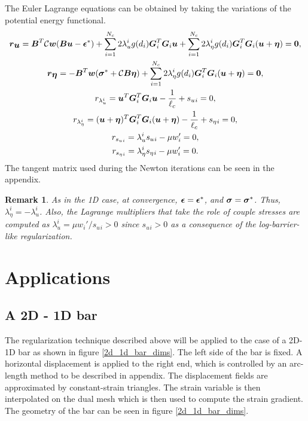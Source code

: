 \documentclass[11pt]{elsarticle}
\newtheorem*{remark}{Remark}
\begin{document}
The Euler Lagrange equations can be obtained by taking the variations of the potential energy functional.
\begin{gather}
	\mbox{\boldmath $r$}_{\mbox{\boldmath $u$}} = \mbox{\boldmath $B$}^T \mathcal{C} \mbox{\boldmath $w$}(\mbox{\boldmath $B$} \mbox{\boldmath $u$} - \mbox{\boldmath $\epsilon$}^*) + \sum_{i=1}^{N_c} 2 \lambda_u^ i  g(d_i) \mbox{\boldmath $G$}_i ^T \mbox{\boldmath $G$}_i \mbox{\boldmath $u$}
	+\sum_{i=1}^{N_c} 2 \lambda_\eta^ i  g(d_i) \mbox{\boldmath $G$}_i ^T \mbox{\boldmath $G$}_i (\mbox{\boldmath $u$}+\mbox{\boldmath $\eta$}) = \bf0, \\
	\mbox{\boldmath $r$}_{\mbox{\boldmath $\eta$}} = -\mbox{\boldmath $B$}^T \mbox{\boldmath $w$}(\mbox{\boldmath $\sigma$}^*+ \mathcal{C} \mbox{\boldmath $B$} \mbox{\boldmath $\eta$} ) 
	+\sum_{i=1}^{N_c} 2 \lambda_\eta^ i  g(d_i) \mbox{\boldmath $G$}_i ^T \mbox{\boldmath $G$}_i (\mbox{\boldmath $u$}+\mbox{\boldmath $\eta$}) = \bf0, \\
	r_{\lambda_u^ i} = \mbox{\boldmath $u$} ^T \mbox{\boldmath $G$}_i ^T \mbox{\boldmath $G$}_i \mbox{\boldmath $u$} - \frac{1}{\ell_c} +  s_u{_i} = 0, \\
	r_{\lambda_\eta^ i} = (\mbox{\boldmath $u$}+\mbox{\boldmath $\eta$}) ^T \mbox{\boldmath $G$}_i ^T \mbox{\boldmath $G$}_i (\mbox{\boldmath $u$}+\mbox{\boldmath $\eta$}) - \frac{1}{\ell_c} +  s_\eta{_i} = 0, \\ 
	r_{s_u{_i}} = \lambda_u^ i s_u{_i} - \mu w_i'   = 0, \\
	r_{s_\eta{_i}} = \lambda_\eta^ i s_\eta{_i} - \mu w_i'   = 0.
\end{gather}
The tangent matrix used during the Newton iterations can be seen in the appendix.

\begin{remark}
As in the 1D case, at convergence, $\mbox{\boldmath $\epsilon$} = \mbox{\boldmath $\epsilon$}^*$, and $\mbox{\boldmath $\sigma$} = \mbox{\boldmath $\sigma$}^*$. Thus, $\lambda_\eta^ i = -\lambda_u^ i$. Also, the Lagrange multipliers that take the role of couple stresses are computed as $\lambda_u^ i  =  \mu w_i'/ s_u{_i} >0$ since $s_u{_i} >0$ as a consequence of the log-barrier-like regularization.
\end{remark}

\section{Applications}
\subsection{A 2D - 1D bar}
The regularization technique described above will be applied to the case of a 2D-1D bar as shown in figure \ref{2d_1d_bar_dims}. The left side of the bar is fixed. A horizontal displacement is applied to the right end, which is controlled by an arc-length method to be described in appendix. The displacement fields are approximated by constant-strain triangles. The strain variable is then interpolated on the dual mesh which is then used to compute the strain gradient. The geometry of the bar can be seen in figure \ref{2d_1d_bar_dims}.
\end{document}
